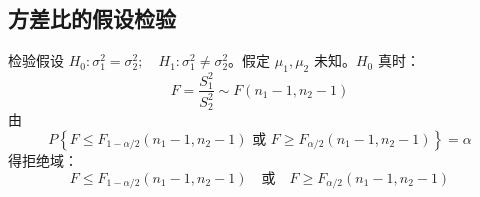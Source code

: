 \subsection{方差比的假设检验}
\begin{theorem}
检验假设 $H_0: \sigma_1^2 = \sigma_2^2;\quad H_1: \sigma_1^2 \neq \sigma_2^2$。假定 $\mu_1, \mu_2$ 未知。$H_0$ 真时：
\begin{equation}
	F = \frac{S_1^2}{S_2^2} \sim F(n_1 - 1, n_2 - 1)
	\label{eq:假设检验:F}
\end{equation}
由
\begin{equation}
	P\left\{F \le F_{1-\alpha/2}(n_1-1, n_2-1) \text{ 或 } F \ge F_{\alpha/2}(n_1-1, n_2-1)\right\} = \alpha
	\label{eq:假设检验:F概率}
\end{equation}
得拒绝域：
\begin{equation}
	F \le F_{1-\alpha/2}(n_1-1, n_2-1) \quad \text{或} \quad F \ge F_{\alpha/2}(n_1-1, n_2-1)
	\label{eq:假设检验:F拒绝域}
\end{equation}
\end{theorem}
